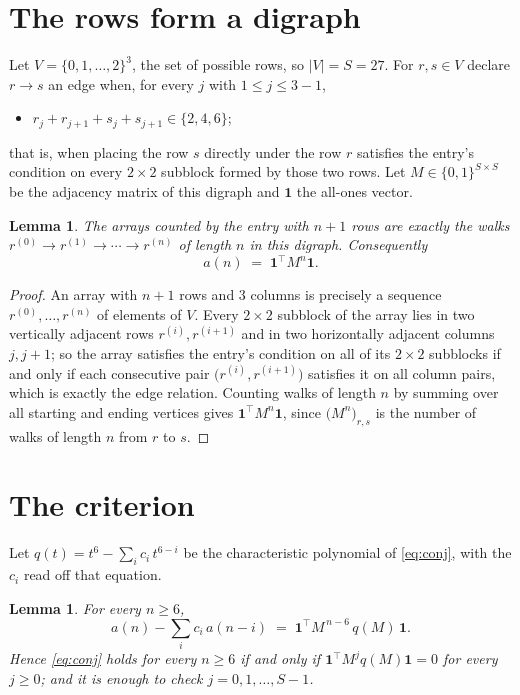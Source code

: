 \documentclass[11pt,a4paper]{article}
\theoremstyle{plain}
\newtheorem{lemma}[theorem]{Lemma}
\theoremstyle{definition}
\begin{document}
\section{The rows form a digraph}

Let $V=\{0,1,\dots,2\}^{3}$, the set of possible rows, so $|V|=S=27$. For
$r,s\in V$ declare $r\to s$ an edge when, for every $j$ with $1\le j\le 3-1$,
\begin{itemize}
\item $r_j+r_{j+1}+s_j+s_{j+1}\in\{2, 4, 6\}$;

\end{itemize}
that is, when placing the row $s$ directly under the row $r$ satisfies the entry's
condition on every $2\times2$ subblock formed by those two rows. Let $M\in\{0,1\}^{S\times
S}$ be the adjacency matrix of this digraph and $\mathbf{1}$ the all-ones vector.

\begin{lemma}\label{lem:walk}
The arrays counted by the entry with $n+1$ rows are exactly the walks
$r^{(0)}\to r^{(1)}\to\cdots\to r^{(n)}$ of length $n$ in this digraph. Consequently
\[
a(n)\;=\;\mathbf{1}^{\!\top}M^{n}\mathbf{1} .
\]
\end{lemma}

\begin{proof}
An array with $n+1$ rows and $3$ columns is precisely a sequence
$r^{(0)},\dots,r^{(n)}$ of elements of $V$. Every $2\times2$ subblock of the array lies
in two vertically adjacent rows $r^{(i)},r^{(i+1)}$ and in two horizontally adjacent
columns $j,j+1$; so the array satisfies the entry's condition on all of its $2\times2$
subblocks if and only if each consecutive pair $\bigl(r^{(i)},r^{(i+1)}\bigr)$ satisfies
it on all column pairs, which is exactly the edge relation. Counting walks of length $n$ by
summing over all starting and ending vertices gives
$\mathbf{1}^{\!\top}M^{n}\mathbf{1}$, since
$\bigl(M^{n}\bigr)_{r,s}$ is the number of walks of length $n$ from $r$ to $s$.
\end{proof}

\section{The criterion}

Let $q(t)=t^{6}-\sum_{i}c_i\,t^{6-i}$ be the characteristic polynomial of
\eqref{eq:conj}, with the $c_i$ read off that equation.

\begin{lemma}\label{lem:crit}
For every $n\ge6$,
\[
a(n)-\sum_i c_i\,a(n-i)\;=\;\mathbf{1}^{\!\top}M^{\,n-6}\,q(M)\,\mathbf{1} .
\]
Hence \eqref{eq:conj} holds for every $n\ge6$ if and only if
$\mathbf{1}^{\!\top}M^{j}q(M)\mathbf{1}=0$ for every $j\ge0$; and it is enough to
check $j=0,1,\dots,S-1$.
\end{lemma}
\end{document}
